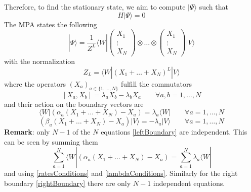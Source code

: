 \documentclass[11pt]{article}
\numberwithin{equation}{section}
\numberwithin{equation}{subsection}
\begin{document}
 Therefore, to find the stationary state, we aim to compute $|\Psi\rangle$ such that 
\begin{equation}
	H|\Psi\rangle =0
\end{equation}
The MPA states the following
\begin{equation}
	|\Psi\rangle=\frac{1}{Z^{L}}\langle W|\begin{pmatrix}
		X_{1}\\
		\vdots\\
		X_{N}
	\end{pmatrix}\otimes \ldots\otimes \begin{pmatrix}
		X_{1}\\
		\vdots\\
		X_{N}
	\end{pmatrix}|V\rangle
\end{equation}
with the normalization 
\begin{equation}
	Z_{L}=\langle W|(X_{1}+\ldots +X_{N})^{L}|V\rangle
\end{equation}
where the operators $(X_{a})_{a\in \{1,\ldots,N\}}$ fulfill the commutators
\begin{equation}\label{bula}
	\left[X_{a},X_{b}\right]=\lambda_{a}X_{b}-\lambda_{b}X_{a}\qquad\forall a,b=1,\ldots,N
\end{equation}
and their action on the boundary vectors are
\begin{equation}\label{leftBoundary}
	\langle W|\left(\alpha_{a}(X_{1}+\ldots+X_{N})-X_{a}\right)=\lambda_{a}\langle W|\qquad\forall a=1,\ldots,N
\end{equation}
\begin{equation}\label{rightBoundary}
	\left(\beta_{a}(X_{1}+\ldots+X_{N})-X_{a}\right)|V\rangle=-\lambda_{a}|V\rangle\qquad\forall a=1,\ldots,N
\end{equation}
\newline
\textbf{Remark}: only $N-1$ of the $N$ equations \eqref{leftBoundary}  are independent. This can be seen by summing them 
	\begin{equation}
		\sum_{a=1}^{N}	\langle W|\left(\alpha_{a}(X_{1}+\ldots+X_{N})-X_{a}\right)=\sum_{a=1}^{N}\lambda_{a}\langle W|
	\end{equation}
	and using  \eqref{ratesConditions} and \eqref{lambdaConditions}.
 Similarly for the right boundary  \eqref{rightBoundary} there are only  $N-1$ independent equations.
\end{document}
